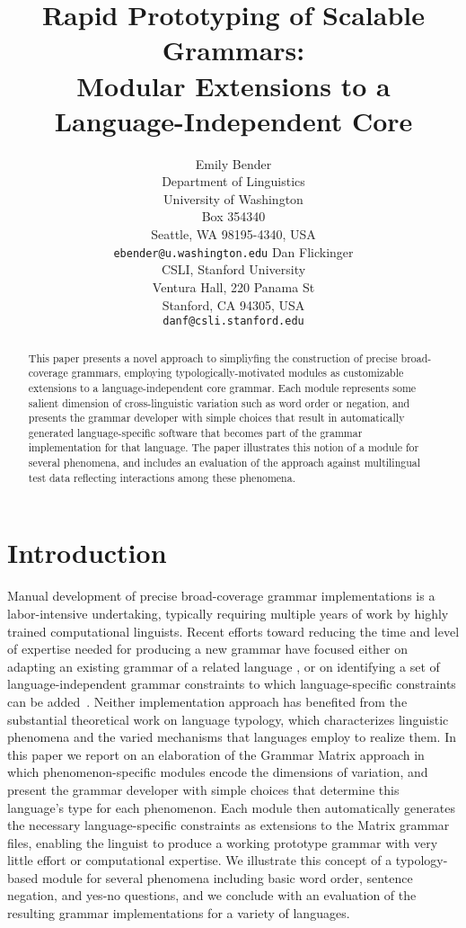 \documentclass[11pt]{article}
\title{Rapid Prototyping of Scalable Grammars:\\
       Modular Extensions to a Language-Independent Core}
\author{Emily Bender\\
Department of Linguistics\\
University of Washington\\
Box 354340\\
Seattle, WA 98195-4340, USA\\
{\small {\tt ebender@u.washington.edu}}
\And
Dan Flickinger\\
CSLI, Stanford University\\
Ventura Hall, 220 Panama St\\
Stanford, CA 94305, USA\\
{\small {\tt danf@csli.stanford.edu}}
}
\date{}
\begin{document}
\maketitle
\begin{abstract}
This paper presents a novel approach to simpliyfing the construction of 
precise broad-coverage grammars, employing typologically-motivated modules
as customizable extensions to a language-independent core grammar.  Each
module represents some salient dimension of cross-linguistic variation such
as word order or negation, and presents the grammar developer with simple 
choices that result in automatically generated language-specific software 
that becomes part of the grammar implementation for that language.  The 
paper illustrates this notion of a module for several phenomena, and 
includes an evaluation of the approach against multilingual test data
reflecting interactions among these phenomena.
\end{abstract}

\section{Introduction}
Manual development of precise broad-coverage grammar implementations
is a labor-intensive undertaking, typically requiring multiple years
of work by highly trained computational linguists.  Recent efforts
toward reducing the time and level of expertise needed for producing a
new grammar have focused either on adapting an existing grammar of a
related language \cite{Butt-et-al-02,Kim:Dal:Kap:Kin:Mas:Ohk:03}, or
on identifying a set of language-independent grammar constraints to
which language-specific constraints can be added~\cite{Ben:Fli:Oe:02}.
Neither implementation approach has benefited from the substantial
theoretical work on language typology, which characterizes linguistic
phenomena and the varied mechanisms that languages employ to realize
them.  In this paper we report on an elaboration of the Grammar Matrix
approach in which phenomenon-specific modules encode the dimensions of
variation, and present the grammar developer with simple choices that
determine this language's type for each phenomenon. Each module then
automatically generates the necessary language-specific constraints as
extensions to the Matrix grammar files, enabling the linguist to
produce a working prototype grammar with very little effort or
computational expertise.  We illustrate this concept of a
typology-based module for several phenomena including basic word
order, sentence negation, and yes-no questions, and we conclude with
an evaluation of the resulting grammar implementations for a variety
of languages.
\end{document}
